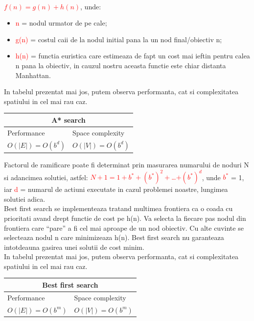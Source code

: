 \documentclass{article}
\begin{document}
\begin{flushleft}
\textbf{\textcolor{red}{\bfseries{\\$ f(n)=g(n)+h(n) $}}}, unde:
\begin{itemize}
\bfseries
    \item \textcolor{red}{n} = nodul urmator de pe cale;
    \item \textcolor{red}{g(n)} = costul caii de la nodul initial pana la un nod final/obiectiv n;
    \item \textcolor{red}{h(n)} = functia euristica care estimeaza de fapt un cost mai ieftin pentru calea n pana la obiectiv, in cauzul nostru aceasta functie este chiar distanta Manhattan.
\end{itemize}
\vspace{2mm}
In tabelul prezentat mai jos, putem observa performanta, cat si complexitatea spatiului in cel mai rau caz.
\par
\begin{center}
\begin{tabular}{|p{4cm}|p{4cm}|}
    \hline
    \multicolumn{2}{|c|}{\bfseries A* search}\\
    \hline
    Performance&  Space complexity\\
    \hline
    \(O(|E|)=O(b^d)\)& \(O(|V|)=O(b^d) \)\\
    \hline
\end{tabular}
\end{center}
Factorul de ramificare poate fi determinat prin masurarea numarului de noduri N si adancimea solutiei, astfel: \textcolor{red}{$N+1=1+b^*+(b^*)^2+$\dots$+(b^*)^d$}, unde \textcolor{red}{$b^*$} = 1, iar \textcolor{red}{d} = numarul de actiuni executate in cazul problemei noastre, lungimea solutiei adica.\\
\vspace{10mm}
Best first search se implementeaza tratand multimea frontiera ca o coada cu prioritati avand drept functie de cost pe h(n). Va selecta la fiecare pas nodul din frontiera care “pare” a fi cel mai aproape de un nod obiectiv. Cu alte cuvinte se selecteaza nodul n care minimizeaza h(n). Best first search nu garanteaza intotdeauna gasirea unei solutii de cost minim.
\newline \\
In tabelul prezentat mai jos, putem observa performanta, cat si complexitatea spatiului in cel mai rau caz.
\begin{center}
\begin{tabular}{|p{4cm}|p{4cm}|}
    \hline
    \multicolumn{2}{|c|}{\bfseries Best first search}\\
    \hline
    Performance&  Space complexity\\
    \hline
    \(O(|E|)=O(b^m)\)& \(O(|V|)=O(b^m) \)\\
    \hline
\end{tabular}
\end{center}


\end{flushleft}
\end{document}
